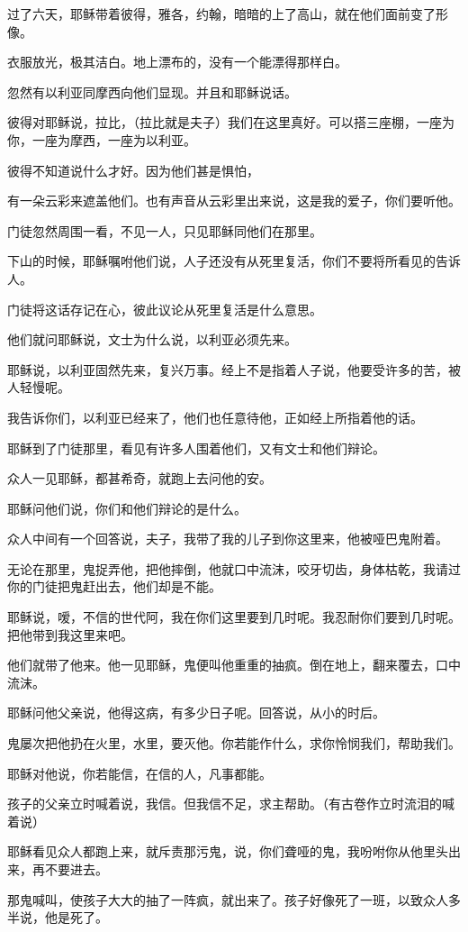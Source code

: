 \documentclass[12pt,oneside]{book}
\begin{document}
过了六天，耶稣带着彼得，雅各，约翰，暗暗的上了高山，就在他们面前变了形像。

衣服放光，极其洁白。地上漂布的，没有一个能漂得那样白。

忽然有以利亚同摩西向他们显现。并且和耶稣说话。

彼得对耶稣说，拉比，（拉比就是夫子）我们在这里真好。可以搭三座棚，一座为你，一座为摩西，一座为以利亚。

彼得不知道说什么才好。因为他们甚是惧怕，

有一朵云彩来遮盖他们。也有声音从云彩里出来说，这是我的爱子，你们要听他。

门徒忽然周围一看，不见一人，只见耶稣同他们在那里。

下山的时候，耶稣嘱咐他们说，人子还没有从死里复活，你们不要将所看见的告诉人。

门徒将这话存记在心，彼此议论从死里复活是什么意思。

他们就问耶稣说，文士为什么说，以利亚必须先来。

耶稣说，以利亚固然先来，复兴万事。经上不是指着人子说，他要受许多的苦，被人轻慢呢。

我告诉你们，以利亚已经来了，他们也任意待他，正如经上所指着他的话。

耶稣到了门徒那里，看见有许多人围着他们，又有文士和他们辩论。

众人一见耶稣，都甚希奇，就跑上去问他的安。

耶稣问他们说，你们和他们辩论的是什么。

众人中间有一个回答说，夫子，我带了我的儿子到你这里来，他被哑巴鬼附着。

无论在那里，鬼捉弄他，把他摔倒，他就口中流沫，咬牙切齿，身体枯乾，我请过你的门徒把鬼赶出去，他们却是不能。

耶稣说，嗳，不信的世代阿，我在你们这里要到几时呢。我忍耐你们要到几时呢。把他带到我这里来吧。

他们就带了他来。他一见耶稣，鬼便叫他重重的抽疯。倒在地上，翻来覆去，口中流沫。

耶稣问他父亲说，他得这病，有多少日子呢。回答说，从小的时后。

鬼屡次把他扔在火里，水里，要灭他。你若能作什么，求你怜悯我们，帮助我们。

耶稣对他说，你若能信，在信的人，凡事都能。

孩子的父亲立时喊着说，我信。但我信不足，求主帮助。（有古卷作立时流泪的喊着说）

耶稣看见众人都跑上来，就斥责那污鬼，说，你们聋哑的鬼，我吩咐你从他里头出来，再不要进去。

那鬼喊叫，使孩子大大的抽了一阵疯，就出来了。孩子好像死了一班，以致众人多半说，他是死了。
\end{document}
